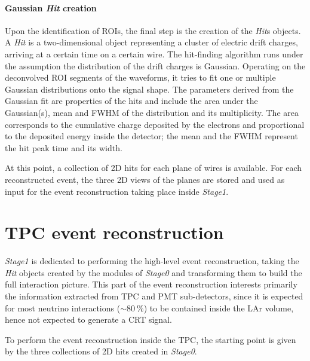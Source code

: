 \paragraph{Gaussian \emph{Hit} creation} Upon the identification of ROIs, the final step is the creation of the \emph{Hit}s objects. A \emph{Hit} is a two-dimensional object representing a cluster of electric drift charges, arriving at a certain time on a certain wire. The hit-finding algorithm runs under the assumption the distribution of the drift charges is Gaussian. Operating on the deconvolved ROI segments of the waveforms, it tries to fit one or multiple Gaussian distributions onto the signal shape. The parameters derived from the Gaussian fit are properties of the hits and include the area under the Gaussian(s), mean and FWHM of the distribution and its multiplicity. The area corresponds to the cumulative charge deposited by the electrons and proportional to the deposited energy inside the detector; the mean and the FWHM represent the hit peak time and its width. 

At this point, a collection of 2D hits for each plane of wires is available. For each reconstructed event, the three 2D views of the planes are stored and used as input for the event reconstruction taking place inside \emph{Stage1}. 

\section{TPC event reconstruction} \label{sec:TPC_reco_gen}

\emph{Stage1} is dedicated to performing the high-level event reconstruction, taking the \emph{Hit} objects created by the modules of \emph{Stage0} and transforming them to build the full interaction picture. This part of the event reconstruction interests primarily the information extracted from TPC and PMT sub-detectors, since it is expected for most neutrino interactions (${\sim}\SI{80}{\percent}$) to be contained inside the LAr volume, hence not expected to generate a CRT signal. 

To perform the event reconstruction inside the TPC, the starting point is given by the three collections of 2D hits created in \emph{Stage0}.

